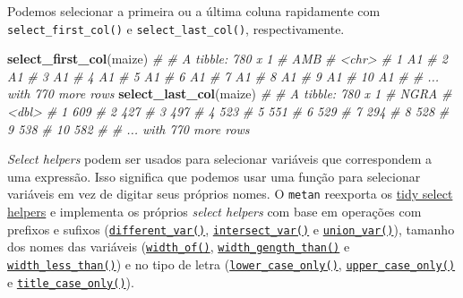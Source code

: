 \documentclass[
]{book}
\newenvironment{Shaded}{\begin{snugshade}}{\end{snugshade}}
\newcommand{\CommentTok}[1]{\textcolor[rgb]{0.56,0.35,0.01}{\textit{#1}}}
\newcommand{\KeywordTok}[1]{\textcolor[rgb]{0.13,0.29,0.53}{\textbf{#1}}}
\newcommand{\NormalTok}[1]{#1}
\begin{document}
Podemos selecionar a primeira ou a última coluna rapidamente com \texttt{select\_first\_col()} e \texttt{select\_last\_col()}, respectivamente.

\begin{Shaded}
\begin{Highlighting}[]
\KeywordTok{select_first_col}\NormalTok{(maize)}
\CommentTok{# # A tibble: 780 x 1}
\CommentTok{#    AMB  }
\CommentTok{#    <chr>}
\CommentTok{#  1 A1   }
\CommentTok{#  2 A1   }
\CommentTok{#  3 A1   }
\CommentTok{#  4 A1   }
\CommentTok{#  5 A1   }
\CommentTok{#  6 A1   }
\CommentTok{#  7 A1   }
\CommentTok{#  8 A1   }
\CommentTok{#  9 A1   }
\CommentTok{# 10 A1   }
\CommentTok{# # ... with 770 more rows}
\KeywordTok{select_last_col}\NormalTok{(maize)}
\CommentTok{# # A tibble: 780 x 1}
\CommentTok{#     NGRA}
\CommentTok{#    <dbl>}
\CommentTok{#  1   609}
\CommentTok{#  2   427}
\CommentTok{#  3   497}
\CommentTok{#  4   523}
\CommentTok{#  5   551}
\CommentTok{#  6   529}
\CommentTok{#  7   294}
\CommentTok{#  8   528}
\CommentTok{#  9   538}
\CommentTok{# 10   582}
\CommentTok{# # ... with 770 more rows}
\end{Highlighting}
\end{Shaded}

\emph{Select helpers} podem ser usados para selecionar variáveis que correspondem a uma expressão. Isso significa que podemos usar uma função para selecionar variáveis em vez de digitar seus próprios nomes. O \texttt{metan} reexporta os \href{https://tidyselect.r-lib.org/reference/select_helpers.html}{tidy select helpers} e implementa os próprios \emph{select helpers} com base em operações com prefixos e sufixos (\href{https://tiagoolivoto.github.io/metan/reference/Select_helper.html}{\texttt{different\_var()}}, \href{https://tiagoolivoto.github.io/metan/reference/Select_helper.html}{\texttt{intersect\_var()}} e \href{https://tiagoolivoto.github.io/metan/reference/Select_helper.html}{\texttt{union\_var()}}), tamanho dos nomes das variáveis (\href{https://tiagoolivoto.github.io/metan/\%20reference\%20/\%20Select_helper.html}{\texttt{width\_of()}}, \href{https://tiagoolivoto.github.io/metan/reference/Select_helper.html}{\texttt{width\_gength\_than()}} e \href{https:\%20//tiagoolivoto.github\%20.io\%20/\%20metan\%20/\%20reference\%20/\%20Select_helper.html}{\texttt{width\_less\_than()}}) e no tipo de letra (\href{https://tiagoolivoto.github.io/metan/reference/Select_helper.html}{\texttt{lower\_case\_only()}}, \href{https://tiagoolivoto.github.io/metan/reference/Select_helper.html}{\texttt{upper\_case\_only()}} e \href{https:\%20//tiagoolivoto.github\%20.io\%20/\%20metan\%20/\%20reference\%20/\%20Select_helper.html}{\texttt{title\_case\_only()}}).
\end{document}
